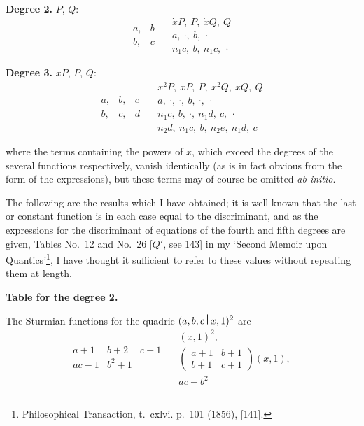 \documentclass[12pt,a4paper]{article}
\theoremstyle{definition}
\begin{document}
\medskip

\noindent\textbf{Degree 2.} $P$, $Q$:
\[
\begin{array}{cc}
a, & b \\
b, & c
\end{array}
\quad
\begin{array}{c}
\dot{x}P,\ P,\ \dot{x}Q,\ Q \\
a,\ \cdot,\ b,\ \cdot \\
n_1 c,\ b,\ n_1 c,\ \cdot
\end{array}
\]

\medskip

\noindent\textbf{Degree 3.} $xP$, $P$, $Q$:
\[
\begin{array}{ccc}
a, & b, & c \\
b, & c, & d
\end{array}
\quad
\begin{array}{c}
x^2P,\ xP,\ P,\ x^2Q,\ xQ,\ Q \\
a,\ \cdot,\ \cdot,\ b,\ \cdot,\ \cdot \\
n_1 c,\ b,\ \cdot,\ n_1 d,\ c,\ \cdot \\
n_2 d,\ n_1 c,\ b,\ n_2 e,\ n_1 d,\ c
\end{array}
\]

where the terms containing the powers of $x$, which exceed the degrees of the several functions respectively, vanish identically (as is in fact obvious from the form of the expressions), but these terms may of course be omitted \textit{ab initio}.

\medskip

The following are the results which I have obtained; it is well known that the last or constant function is in each case equal to the discriminant, and as the expressions for the discriminant of equations of the fourth and fifth degrees are given, Tables No.~12 and No.~26 [$Q'$, see 143] in my `Second Memoir upon Quantics'\footnote{Philosophical Transaction, t.~cxlvi. p.~101 (1856), [141].}, I have thought it sufficient to refer to these values without repeating them at length.

\bigskip
\noindent\textbf{Table for the degree 2.}

The Sturmian functions for the quadric $(a,b,c\,\raisebox{0.5ex}{\textbf{\textbar}}\,x,1)^2$ are
\[
\begin{array}{c|c|c}
a+1 & b+2 & c+1 \\ \hline
ac-1 & b^2+1 & 
\end{array}
\quad
\begin{array}{c}
(x,1)^2, \\
\begin{pmatrix} a+1 & b+1 \\ b+1 & c+1 \end{pmatrix}(x,1), \\
ac-b^2
\end{array}
\]
\end{document}
